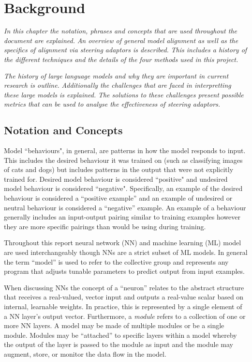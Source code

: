 \chapter{Background}
\label{ch:background}

\emph{In this chapter the notation, phrases and concepts that are used throughout the document are explained.}
\emph{An overview of general model alignment as well as the specifics of alignment via steering adaptors is described.}
\emph{This includes a history of the different techniques and the details of the four methods used in this project.}

\emph{The history of large language models and why they are important in current research is outline.}
\emph{Additionally the challenges that are faced in interpretting these large models is explained.}
\emph{The solutions to these challenges present possible metrics that can be used to analyse the effectiveness of steering adaptors.}

\section{Notation and Concepts}

Model ``behaviours", in general, are patterns in how the model responds to input.
This includes the desired behaviour it was trained on (such as classifying images of cats and dogs) but includes patterns in the output that were not explicitly trained for.
Desired model behaviour is considered ``positive" and undesired model behaviour is considered ``negative".
Specifically, an example of the desired behaviour is considered a ``positive example'' and an example of undesired or neutral behaviour is considered a ``negative'' example.
An example of a behaviour generally includes an input-output pairing similar to training examples however they are more specific pairings than would be using during training.

Throughout this report neural network (NN) and machine learning (ML) model are used interchangeably though NNs are a strict subset of ML models.
In general the term ``model'' is used to refer to the collective group and represents any program that adjusts tunable parameters to predict output from input examples.

When discussing NNs the concept of a ``neuron'' relates to the abstract structure that receives a real-valued, vector input and outputs a real-value scalar based on internal, learnable weights.
In practice, this is represented by a single element of a NN layer's output vector.
Furthermore, a \emph{module} refers to a collection of one or more NN layers.
A model may be made of multiple modules or be a single module.
Modules may be ``attached'' to specific layers within a model whereby the output of the layer is passed to the module as input and the module may augment, store, or monitor the data flow in the model.

